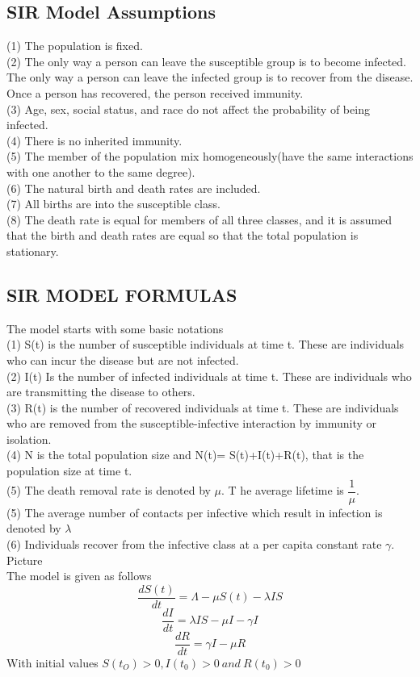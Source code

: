 \documentclass[a4paper,12pt]{report}
\numberwithin{equation}{section}
\begin{document}
\subsection{SIR Model Assumptions}
(1)  The population is fixed.\\
(2) The only way a person can leave the susceptible group is to become infected. The only way a person can leave 
the infected group is to recover from the disease. Once a person has recovered, the person received immunity.\\
(3) Age, sex, social status, and race do not affect the probability of being infected. \\
(4) There is no inherited immunity.\\
(5) The member of the population mix homogeneously(have the same interactions with one another to the same degree).\\
(6) The natural birth and death rates are included.\\
(7) All births are into the susceptible class.\\
(8) The death rate is equal for members of all three classes, and it is assumed that the birth and death rates are equal so that the total population is stationary.\\
\subsection{SIR MODEL FORMULAS}

The model starts with some basic notations \\
(1) S(t) is the number of susceptible individuals at time t. These are individuals who can incur the disease but are not infected. \\
(2) I(t) Is the number of infected individuals at time t. These are individuals who are transmitting the disease to others. \\
(3) R(t) is the number of recovered individuals at time t. These are individuals who are removed from the susceptible-infective interaction by immunity or isolation.\\
(4) N is the total population size and N(t)= S(t)+I(t)+R(t), that is the population size at time t.\\
(5) The death removal rate is denoted by $\mu.$ T he average lifetime is $\dfrac{1}{\mu}$.\\
(5) The average number of contacts per infective which result in infection is denoted by $\lambda$ \\
(6) Individuals recover from the infective class at a per capita constant rate $\gamma$.\\
Picture \\
The model is given as follows
\begin{equation}
\frac{dS(t)}{dt}=\Lambda - \mu S(t) - \lambda IS 
\end{equation}
\begin{equation}
\frac{dI}{dt} = \lambda IS -\mu I - \gamma I 
\end{equation}
\begin{equation}
\frac{dR}{dt} = \gamma I - \mu R
\end{equation}
With initial values $S(t_{O})> 0, I(t_{0})> 0 \ and \ R(t_{0})> 0$
\end{document}

